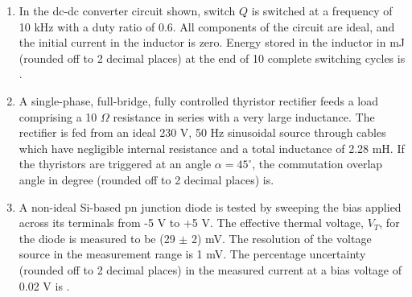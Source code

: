 \documentclass[journal,12pt,onecolumn]{IEEEtran}
\theoremstyle{remark}
\begin{document}
\begin{enumerate}
    \item In the dc-dc converter circuit shown, switch $Q$ is switched at a frequency of 10 kHz with a duty ratio of 0.6. All components of the circuit are ideal, and the initial current in the inductor is zero. Energy stored in the inductor in mJ (rounded off to 2 decimal places) at the end of 10 complete switching cycles is {\underline{\hspace{2cm}}}.
  
    \item A single-phase, full-bridge, fully controlled thyristor rectifier feeds a load comprising a 10 $\Omega$ resistance in series with a very large inductance. The rectifier is fed from an ideal 230 V, 50 Hz sinusoidal source through cables which have negligible internal resistance and a total inductance of 2.28 mH. If the thyristors are triggered at an angle $\alpha = 45^\circ$, the commutation overlap angle in degree (rounded off to 2 decimal places) is{\underline{\hspace{2cm}}}.
   
    \item A non-ideal Si-based pn junction diode is tested by sweeping the bias applied across its terminals from -5 V to +5 V. The effective thermal voltage, $V_T$, for the diode is measured to be (29 $\pm$ 2) mV. The resolution of the voltage source in the measurement range is 1 mV. The percentage uncertainty (rounded off to 2 decimal places) in the measured current at a bias voltage of 0.02 V is {\underline{\hspace{2cm}}}.
\end{enumerate}
\end{document}
